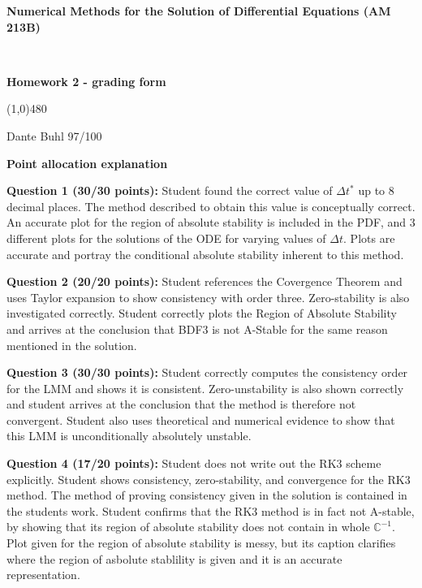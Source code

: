 \documentclass[10pt,english]{article}
\newcommand{\dt}{\Delta t}
\def\vss{\vspace{1cm}}
\def\vs{\vspace{0.2cm}}
\begin{document}
\noindent
\centerline{
\textbf{\large Numerical Methods for the Solution of Differential Equations (AM 213B)}}\\
\centerline{{\bf Homework 2 - grading form}}
%
\centerline{\line(1,0){480}}\vspace{.cm}

\vspace{0.2cm}
 Dante Buhl
\vs
{} 97/100

\vss\noindent
\centerline{\bf Point allocation explanation}


\vs
{\bf Question 1 (30/30 points):} Student found the correct value of $\dt^*$ up to 8
decimal places. The method described to obtain this value is conceptually
correct. An accurate plot for the region of absolute stability is included in
the PDF, and 3 different plots for the solutions of the ODE for varying values
of $\dt$. Plots are accurate and portray the conditional absolute stability
inherent to this method. 

\vs   
{\bf Question 2 (20/20 points):} Student references the Covergence Theorem and
uses Taylor expansion to show consistency with order three. Zero-stability is
also investigated correctly. Student correctly plots the Region of Absolute
Stability and arrives at the conclusion that BDF3 is not A-Stable for the same reason mentioned in
the solution. 

\vs
{\bf Question 3 (30/30 points):} Student correctly computes the consistency order
for the LMM and shows it is consistent. Zero-unstability is also shown correctly
and student arrives at the conclusion that the method is therefore not
convergent. Student also uses theoretical and numerical evidence to show that
this LMM is unconditionally absolutely unstable. 


\vs
{\bf Question 4 (17/20 points):} Student does not write out the RK3 scheme
explicitly. Student shows consistency, zero-stability, and convergence for the
RK3 method. The method of proving consistency given in the solution is contained
in the students work. Student confirms that the RK3 method is in fact not
A-stable, by showing that its region of absolute stability does not contain in
whole $\mathbb{C}^{-1}$. Plot given for the region of absolute stability is
messy, but its caption clarifies where the region of asbolute stablility is
given and it is an accurate representation. 
\end{document}
